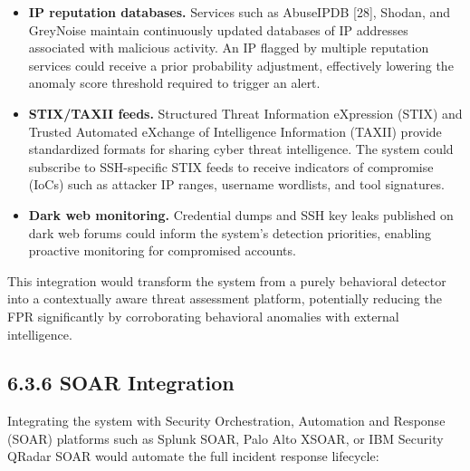 \documentclass[
  a4paper]{report}
\providecommand{\tightlist}{%
  \setlength{\itemsep}{0pt}\setlength{\parskip}{0pt}}
\begin{document}
\begin{itemize}
\tightlist
\item
  \textbf{IP reputation databases.} Services such as AbuseIPDB {[}28{]},
  Shodan, and GreyNoise maintain continuously updated databases of IP
  addresses associated with malicious activity. An IP flagged by
  multiple reputation services could receive a prior probability
  adjustment, effectively lowering the anomaly score threshold required
  to trigger an alert.
\item
  \textbf{STIX/TAXII feeds.} Structured Threat Information eXpression
  (STIX) and Trusted Automated eXchange of Intelligence Information
  (TAXII) provide standardized formats for sharing cyber threat
  intelligence. The system could subscribe to SSH-specific STIX feeds to
  receive indicators of compromise (IoCs) such as attacker IP ranges,
  username wordlists, and tool signatures.
\item
  \textbf{Dark web monitoring.} Credential dumps and SSH key leaks
  published on dark web forums could inform the system's detection
  priorities, enabling proactive monitoring for compromised accounts.
\end{itemize}

This integration would transform the system from a purely behavioral
detector into a contextually aware threat assessment platform,
potentially reducing the FPR significantly by corroborating behavioral
anomalies with external intelligence.

\subsection{6.3.6 SOAR Integration}\label{soar-integration}

Integrating the system with Security Orchestration, Automation and
Response (SOAR) platforms such as Splunk SOAR, Palo Alto XSOAR, or IBM
Security QRadar SOAR would automate the full incident response
lifecycle:
\end{document}
